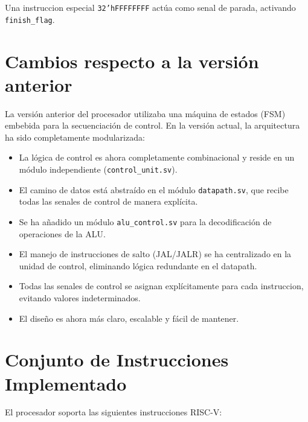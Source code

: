 \documentclass[conference]{IEEEtran}
\begin{document}
Una instruccion especial \texttt{32'hFFFFFFFF} actúa como senal de parada, activando \texttt{finish\_flag}.

\section{Cambios respecto a la versión anterior}
\label{sec:changes}
La versión anterior del procesador utilizaba una máquina de estados (FSM) embebida para la secuenciación de control. En la versión actual, la arquitectura ha sido completamente modularizada:
\begin{itemize}
    \item La lógica de control es ahora completamente combinacional y reside en un módulo independiente (\texttt{control\_unit.sv}).
    \item El camino de datos está abstraído en el módulo \texttt{datapath.sv}, que recibe todas las senales de control de manera explícita.
    \item Se ha añadido un módulo \texttt{alu\_control.sv} para la decodificación de operaciones de la ALU.
    \item El manejo de instrucciones de salto (JAL/JALR) se ha centralizado en la unidad de control, eliminando lógica redundante en el datapath.
    \item Todas las senales de control se asignan explícitamente para cada instruccion, evitando valores indeterminados.
    \item El diseño es ahora más claro, escalable y fácil de mantener.
\end{itemize}

\section{Conjunto de Instrucciones Implementado}
\label{sec:instruction_set}
El procesador soporta las siguientes instrucciones RISC-V:
\end{document}
